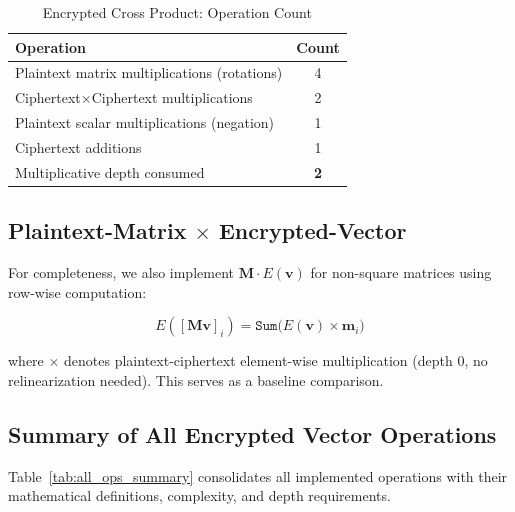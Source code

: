 \documentclass[conference,12pt]{IEEEtran}
\begin{document}
\begin{table}[H]
\centering
\caption{Encrypted Cross Product: Operation Count}
\label{tab:cross_ops}
\begin{tabular}{@{}lc@{}}
\toprule
\textbf{Operation} & \textbf{Count} \\
\midrule
Plaintext matrix multiplications (rotations) & 4 \\
Ciphertext$\times$Ciphertext multiplications & 2 \\
Plaintext scalar multiplications (negation) & 1 \\
Ciphertext additions & 1 \\
Multiplicative depth consumed & \textbf{2} \\
\bottomrule
\end{tabular}
\end{table}

\subsection{Plaintext-Matrix $\times$ Encrypted-Vector}

For completeness, we also implement $\mathbf{M} \cdot E(\mathbf{v})$ for non-square matrices using row-wise computation:

\begin{equation}
    E([\mathbf{Mv}]_i) = \texttt{Sum}\big(E(\mathbf{v}) \times \mathbf{m}_i\big)
    \label{eq:plain_matvec}
\end{equation}

where $\times$ denotes plaintext-ciphertext element-wise multiplication (depth 0, no relinearization needed). This serves as a baseline comparison.

\subsection{Summary of All Encrypted Vector Operations}

Table~\ref{tab:all_ops_summary} consolidates all implemented operations with their mathematical definitions, complexity, and depth requirements.
\end{document}
